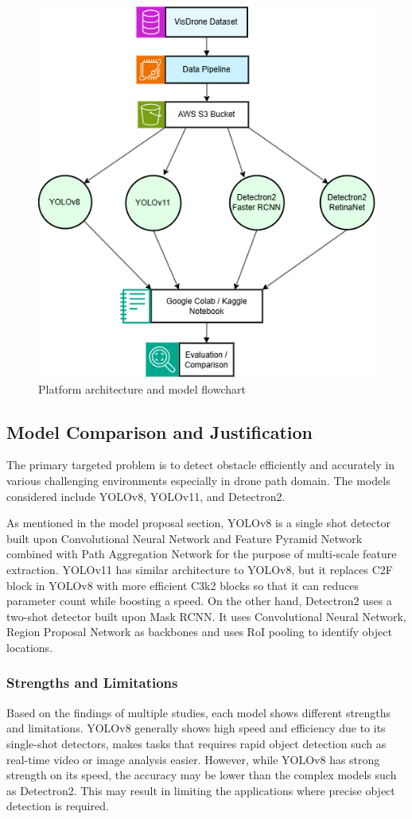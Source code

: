 \documentclass[stu,12pt,floatsintext]{apa7}
\begin{document}
\begin{figure}[!htb]
	\centering
	\includegraphics[width=0.6\linewidth]{images/modelsupportDiagram.png}
	\caption{Platform architecture and model flowchart}
	\label{fig:mlFlowchart}
\end{figure}


\subsection{Model Comparison and Justification}

The primary targeted problem is to detect obstacle efficiently and accurately in various challenging environments especially in drone path domain. The models considered include YOLOv8, YOLOv11, and Detectron2.

As mentioned in the model proposal section, YOLOv8 is a single shot detector built upon Convolutional Neural Network and Feature Pyramid Network combined with Path Aggregation Network for the purpose of multi-scale feature extraction. YOLOv11 has similar architecture to YOLOv8, but it replaces C2F block in YOLOv8 with more efficient C3k2 blocks so that it can reduces parameter count while boosting a speed. On the other hand, Detectron2 uses a two-shot detector built upon Mask RCNN. It uses Convolutional Neural Network, Region Proposal Network as backbones and uses RoI pooling to identify object locations.


\subsubsection{Strengths and Limitations}
Based on the findings of multiple studies, each model shows different strengths and limitations. YOLOv8 generally shows high speed and efficiency due to its single-shot detectors, makes tasks that requires rapid object detection such as real-time video or image analysis easier. However, while YOLOv8 has strong strength on its speed, the accuracy may be lower than the complex models such as Detectron2. This may result in limiting the applications where precise object detection is required.
\end{document}
